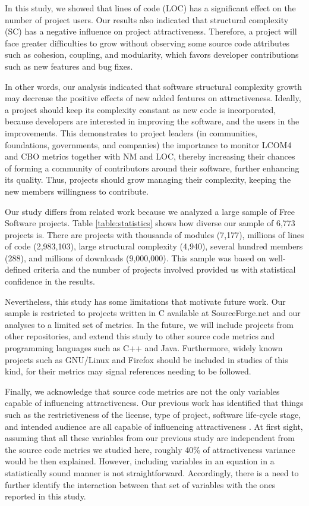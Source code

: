 \documentclass[conference]{IEEEtran}
\begin{document}
In this study, we showed that lines of code (LOC)
has a significant effect on the number of project users.
%
Our results also indicated that structural complexity (SC) has a negative
influence on project attractiveness.
%
Therefore, a project will face greater difficulties to grow without observing
some source code attributes such as cohesion, coupling, and modularity,
which favors developer contributions such as new features and bug fixes.

In other words, our analysis indicated that software structural complexity growth
may decrease the positive effects of new added features on attractiveness.
%
Ideally, a project should keep its complexity constant as new code is incorporated,
because developers are interested in improving the software, and the users in the improvements.
%
This demonstrates to project leaders (in communities, foundations,
governments, and companies)
the importance to monitor LCOM4 and CBO metrics together with NM and LOC,
thereby increasing their chances of forming a community of contributors
around their software, further enhancing its quality.
Thus, projects should grow managing their complexity, keeping the new
members willingness to contribute.

Our study differs from related work because we analyzed a large
sample of Free Software projects. Table \ref {table:statistics} shows how diverse our sample of
6,773 projects is. There are projects with thousands of modules (7,177),
millions of lines of code (2,983,103), large structural complexity (4,940),
several hundred members (288), and millions of downloads (9,000,000).
This sample was based on well-defined criteria and the number of projects
involved provided us with statistical confidence in the results.

Nevertheless, this study has some limitations that motivate future work.
%
Our sample is restricted to projects written in C available at
SourceForge.net and our analyses to a limited set of metrics.
In the future, we will include projects from other repositories, and extend
this study to other source code metrics and programming languages such as C++
and Java. 
%
Furthermore, widely known projects such as GNU/Linux and Firefox should be
included in studies of this kind, for their metrics may signal references
needing to be followed.

Finally, we acknowledge that source code metrics are not the only
variables capable of influencing attractiveness.
%
Our previous work has identified that things such as the restrictiveness of
the license, type of project, software life-cycle stage, and intended audience
are all capable of influencing attractiveness \cite{Santos2010}.
%
At first sight, assuming that all these variables from our previous study are
independent from the source code metrics we studied here, roughly 40\% of attractiveness variance would be then explained.
%
However, including variables in an equation in a statistically sound manner is not
straightforward. Accordingly, there is a need to further identify the interaction
between that set of variables with the ones reported in this study.
\end{document}
